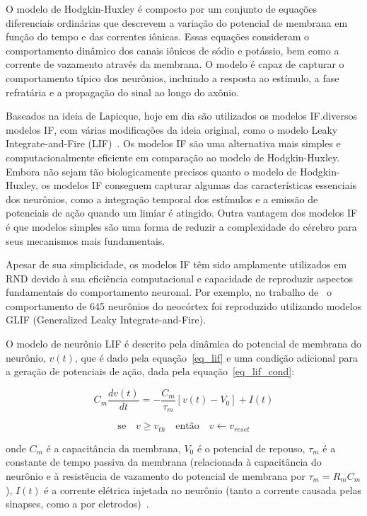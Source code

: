 O modelo de Hodgkin-Huxley é composto por um conjunto de equações diferenciais ordinárias que descrevem a variação do potencial de
membrana em função do tempo e das correntes iônicas. Essas equações consideram o comportamento dinâmico dos canais iônicos de
sódio e potássio, bem como a corrente de vazamento através da membrana. O modelo é capaz de capturar o comportamento típico dos
neurônios, incluindo a resposta ao estímulo, a fase refratária e a propagação do sinal ao longo do axônio.

Baseados na ideia de Lapicque, hoje em dia são utilizados os modelos IF.\@Existem diversos modelos IF, com
várias modificações da ideia original, como o modelo Leaky Integrate-and-Fire (LIF)~\cite{burkittReview2006}. Os modelos IF são
uma alternativa mais simples e computacionalmente eficiente em comparação ao modelo de Hodgkin-Huxley. Embora não sejam tão
biologicamente precisos quanto o modelo de Hodgkin-Huxley, os modelos IF conseguem capturar algumas das características essenciais
dos neurônios, como a integração temporal dos estímulos e a emissão de potenciais de ação quando um limiar é atingido. Outra
vantagem dos modelos IF é que modelos simples são uma forma de reduzir a complexidade do cérebro para seus mecanismos mais
fundamentais.

Apesar de sua simplicidade, os modelos IF têm sido amplamente utilizados em RND devido à sua eficiência computacional e capacidade
de reproduzir aspectos fundamentais do comportamento neuronal. Por exemplo, no trabalho de~\cite{teeterGeneralized2018} o
comportamento de 645 neurônios do neocórtex foi reproduzido utilizando modelos GLIF (Generalized Leaky Integrate-and-Fire). 

O modelo de neurônio LIF é descrito pela dinâmica do potencial de membrana do neurônio, $v(t)$, que é dado pela
equação~\ref{eq_lif} e uma condição adicional para a geração de potenciais de ação, dada pela equação~\ref{eq_lif_cond}:

\begin{equation}
\label{eq_lif}
C_m \frac{dv(t)}{dt} = -\frac{C_m}{\tau_m} [v(t) - V_0] + I(t)
\end{equation}

\begin{equation}
\label{eq_lif_cond}
\text{se}\quad v \ge v_{th} \quad \text{então} \quad v \gets v_{reset}
\end{equation}

onde $C_m$ é a capacitância da membrana, $V_0$ é o potencial de repouso, $\tau_m$ é a constante de tempo passiva da membrana
(relacionada à capacitância do neurônio e à resistência de vazamento do potencial de membrana por $\tau_m = R_m C_m$), $I(t)$ é a
corrente elétrica injetada no neurônio (tanto a corrente causada pelas sinapses, como a por eletrodos)~\cite{burkittReview2006}. 

